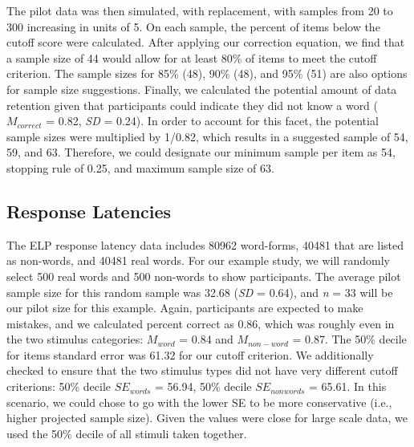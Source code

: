 \documentclass[
  man]{apa6}
\begin{document}
The pilot data was then simulated, with replacement, with samples from 20 to 300 increasing in units of 5. On each sample, the percent of items below the cutoff score were calculated. After applying our correction equation, we find that a sample size of 44 would allow for at least 80\% of items to meet the cutoff criterion. The sample sizes for 85\% (48), 90\% (48), and 95\% (51) are also options for sample size suggestions. Finally, we calculated the potential amount of data retention given that participants could indicate they did not know a word (\(M_{correct}\) = 0.82, \emph{SD} = 0.24). In order to account for this facet, the potential sample sizes were multiplied by 1/0.82, which results in a suggested sample of 54, 59, and 63. Therefore, we could designate our minimum sample per item as 54, stopping rule of 0.25, and maximum sample size of 63.

\hypertarget{response-latencies}{%
\subsection{Response Latencies}\label{response-latencies}}

The ELP response latency data includes 80962 word-forms, 40481 that are listed as non-words, and 40481 real words. For our example study, we will randomly select 500 real words and 500 non-words to show participants. The average pilot sample size for this random sample was 32.68 (\emph{SD} = 0.64), and \emph{n} = 33 will be our pilot size for this example. Again, participants are expected to make mistakes, and we calculated percent correct as 0.86, which was roughly even in the two stimulus categories: \(M_{word}\) = 0.84 and \(M_{non-word}\) = 0.87. The 50\% decile for items standard error was 61.32 for our cutoff criterion. We additionally checked to ensure that the two stimulus types did not have very different cutoff criterions: 50\% decile \(SE_{words}\) = 56.94, 50\% decile \(SE_{nonwords}\) = 65.61. In this scenario, we could chose to go with the lower SE to be more conservative (i.e., higher projected sample size). Given the values were close for large scale data, we used the 50\% decile of all stimuli taken together.
\end{document}
